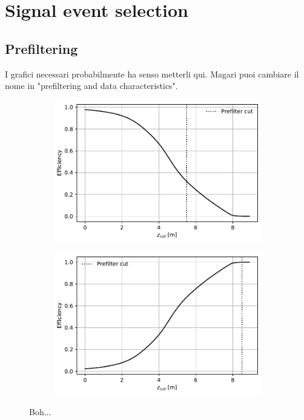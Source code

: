 \chapter{Signal event selection}
\label{cap:event_selection}

\section{Prefiltering}
\label{sec:prefilter}
I grafici necessari probabilmente ha senso metterli qui. Magari puoi cambiare il nome in "prefiltering and data characteristics".

\begin{figure}[t]
	\centering
	\begin{subfigure}{.45\textwidth}
		\includegraphics[width=\textwidth]{graphics/04-event_selection/LEVz_left.pdf}
		\caption{}
	\end{subfigure}
	\begin{subfigure}{.45\textwidth}
		\includegraphics[width=\textwidth]{graphics/04-event_selection/LEVz_right.pdf}
		\caption{}
	\end{subfigure}
	\caption[A and b.]{Boh...}
\end{figure}

